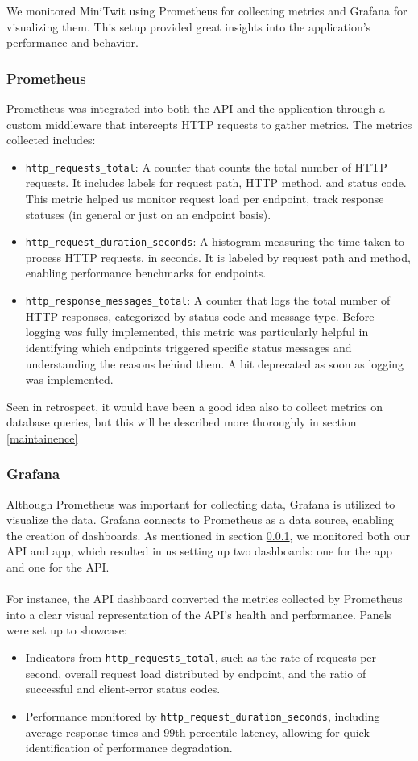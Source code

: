 We monitored MiniTwit using Prometheus for collecting metrics and Grafana for visualizing them. This setup provided great insights into the application's performance and behavior.

\subsubsection{Prometheus}\label{prom}
Prometheus was integrated into both the API and the application through a custom middleware that intercepts HTTP requests to gather metrics. The metrics collected includes:

\begin{itemize}
\item \texttt{http\_requests\_total}: A counter that counts the total number of HTTP requests. It includes labels for request path, HTTP method, and status code. This metric helped us monitor request load per endpoint, track response statuses (in general or just on an endpoint basis).
\item \texttt{http\_request\_duration\_seconds}: A histogram measuring the time taken to process HTTP requests, in seconds. It is labeled by request path and method, enabling performance benchmarks for endpoints.
\item \texttt{http\_response\_messages\_total}: A counter that logs the total number of HTTP responses, categorized by status code and message type. Before logging was fully implemented, this metric was particularly helpful in identifying which endpoints triggered specific status messages and understanding the reasons behind them. A bit deprecated as soon as logging was implemented.
\end{itemize}
Seen in retrospect, it would have been a good idea also to collect metrics on database queries, but this will be described more thoroughly in section \ref{maintainence}

\subsubsection{Grafana}
Although Prometheus was important for collecting data, Grafana is utilized to visualize the data. Grafana connects to Prometheus as a data source, enabling the creation of dashboards. As mentioned in section \ref{prom}, we monitored both our API and app, which resulted in us setting up two dashboards: one for the app and one for the API.
\\\\
For instance, the API dashboard converted the metrics collected by Prometheus into a clear visual representation of the API's health and performance. Panels were set up to showcase:
\begin{itemize}
    \item Indicators from \texttt{http\_requests\_total}, such as the rate of requests per second, overall request load distributed by endpoint, and the ratio of successful and client-error status codes.
    \item Performance monitored by \texttt{http\_request\_duration\_seconds}, including average response times and 99th percentile latency, allowing for quick identification of performance degradation.
\end{itemize}

